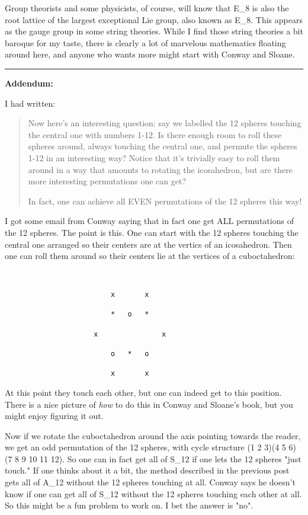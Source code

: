 Group theorists and some physicists, of course, will know that
E_{8} is also the root lattice of the largest exceptional Lie
group, also known as E_{8}.  This appears as the gauge group in
some string theories.  While I find those string theories a bit baroque
for my taste, there is clearly a lot of marvelous mathematics floating
around here, and anyone who wants more might start with Conway and
Sloane.

\par\noindent\rule{\textwidth}{0.4pt}
\textbf{Addendum:} 

I had written:
\begin{quote}
Now here's an interesting question: say we labelled the 12 spheres
touching the central one with numbers 1-12.  Is there enough room to
roll these spheres around, always touching the central one, and permute
the spheres 1-12 in an interesting way?  Notice that it's trivially easy
to roll them around in a way that amounts to rotating the icosahedron,
but are there more interesting permutations one can get?

In fact, one can achieve all EVEN permutations of the 12 spheres this
way! 
\end{quote}

I got some email from Conway saying that in fact one get ALL permutations of 
the 12 spheres.  The point is this.  One can start with the 12 spheres
touching the central one arranged so their centers are at the vertics
of an icosahedron.  Then one can roll them around so their centers lie
at the vertices of a cuboctahedron:


\begin{verbatim}


                         x       x   

                         *   o   * 
 
                     x               x

                         o   *   o

                         x       x
\end{verbatim}
    
                         

At this point they touch each other, but one can indeed get to this position.
There is a nice picture of \emph{how} to do this in Conway and Sloane's 
book, but you might enjoy figuring it out.

Now if we rotate the cuboctahedron around the axis pointing towards
the reader, we get an odd permutation of the 12 spheres, with cycle structure
(1 2 3)(4 5 6)(7 8 9 10 11 12).  So one can in fact get all of S_{12}
if one lets the 12 spheres "just touch."  If one thinks about it a bit,
the method described in the previous post gets all of A_{12} without 
the 12 spheres touching at all.  Conway says he doesn't know if one can get 
all of S_{12} without the 12 spheres touching each other at all.  
So this might be a fun problem to work on.  I bet the answer is "no".

